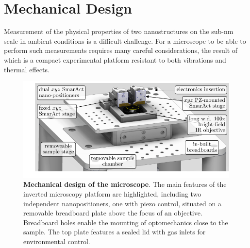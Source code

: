 \documentclass{article}
\begin{document}
\section{Mechanical Design}

Measurement of the physical properties of two nanostructures on the sub-nm scale in ambient conditions is a difficult challenge. For a microscope to be able to perform such measurements requires many careful considerations, the result of which is a compact experimental platform resistant to both vibrations and thermal effects.

\begin{figure}[tb]
\centering
\includegraphics[clip=true, trim=15 10 0 0]{figures/microscope_stage_design}
\caption[Mechanical design of the microscope]{\textbf{Mechanical design of the microscope}. The main features of the inverted microscopy platform are highlighted, including two independent nanopositioners, one with piezo control, situated on a removable breadboard plate above the focus of an objective. Breadboard holes enable the mounting of optomechanics close to the sample. The top plate features a sealed lid with gas inlets for environmental control.}
\label{fig:mechanical_design}
\end{figure}
\end{document}
